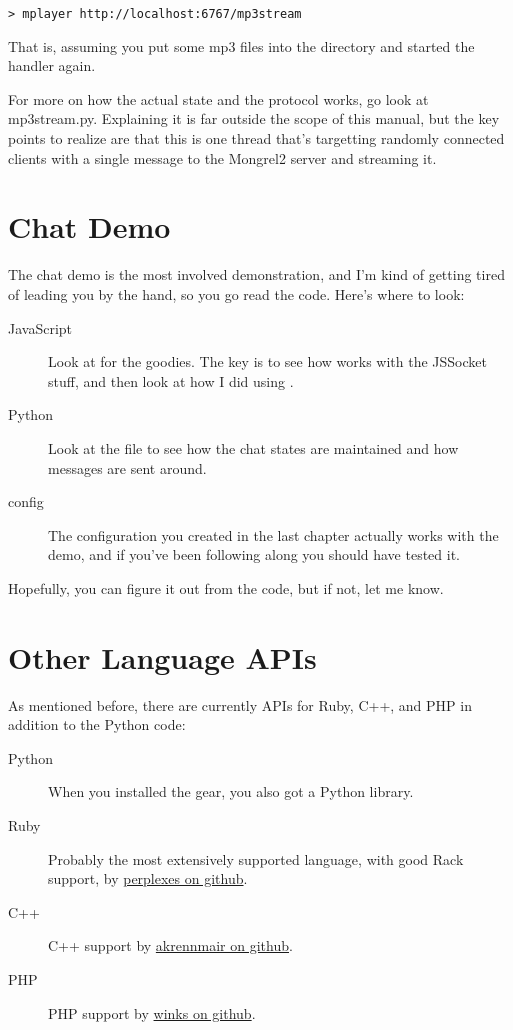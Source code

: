 \begin{lstlisting}
> mplayer http://localhost:6767/mp3stream
\end{lstlisting}

That is, assuming you put some mp3 files into the directory and
started the handler again.

For more on how the actual state and the protocol works, go look
at mp3stream.py.  Explaining it is far outside the scope of this manual,
but the key points to realize are that this is one thread that's
targetting randomly connected clients with a single message to the
Mongrel2 server and streaming it.


\section{Chat Demo}

The chat demo is the most involved demonstration, and I'm kind of getting
tired of leading you by the hand, so you go read the code.  Here's where
to look:

\begin{description}
\item [JavaScript] Look at  for the goodies.
    The key is to see how  works with the JSSocket stuff,
    and then look at how I did  using .
\item [Python] Look at the  file to see how
    the chat states are maintained and how messages are sent around.
\item [config] The configuration you created in the last chapter
    actually works with the demo, and if you've been following along
    you should have tested it.
\end{description}

Hopefully, you can figure it out from the code, but if not, let me know.


\section{Other Language APIs}

As mentioned before, there are currently APIs for Ruby, C++, and PHP in
addition to the Python code:


\begin{description}
\item [Python] When you installed the  gear, you also got a  Python library.
\item [Ruby] Probably the most extensively supported language, with good Rack support, by \href{http://github.com/perplexes/m2r}{perplexes on github}.
\item [C++] C++ support by \href{http://github.com/akrennmair/mongrel2-cpp}{akrennmair on github}.
\item [PHP] PHP support by \href{http://github.com/winks/m2php}{winks on github}.
\end{description}


